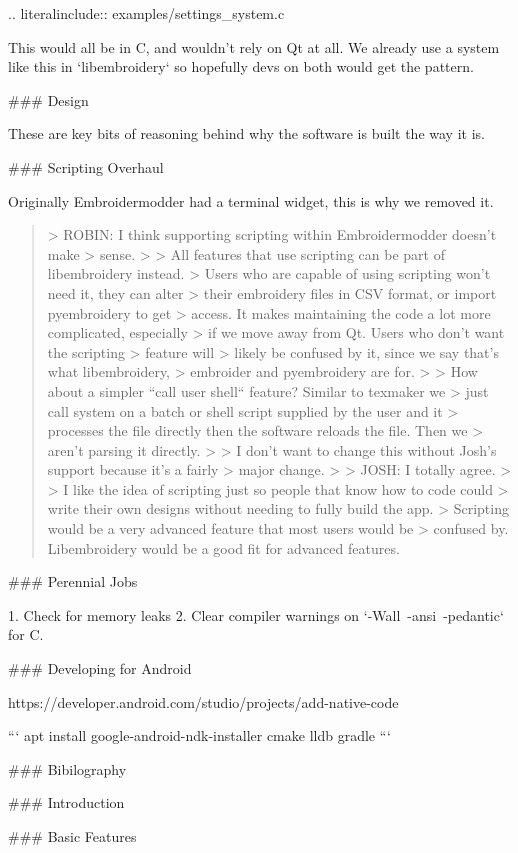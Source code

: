 .. literalinclude:: examples/settings\_system.c

This would all be in C, and wouldn't rely on Qt at all. We already use a
system like this in `libembroidery` so hopefully devs on both
would get the pattern.

### Design

These are key bits of reasoning behind why the software is built the way it is.

### Scripting Overhaul

Originally Embroidermodder had a terminal widget, this is why we removed it.

\begin{quote}
> ROBIN: I think supporting scripting within Embroidermodder doesn't make
> sense.
>
> All features that use scripting can be part of libembroidery instead.
> Users who are capable of using scripting won't need it, they can alter
> their embroidery files in CSV format, or import pyembroidery to get
> access. It makes maintaining the code a lot more complicated, especially
> if we move away from Qt. Users who don't want the scripting > feature will
> likely be confused by it, since we say that's what  libembroidery,
> embroider and pyembroidery are for.
>
> How about a simpler ``call user shell`` feature? Similar to texmaker we
> just call system on a batch or shell script supplied by the user and it
> processes the file directly then the software reloads the file. Then we
> aren't parsing it directly.
>
> I don't want to change this without Josh's support because it's a fairly
> major change.
>
> JOSH: I totally agree.
>
> I like the idea of scripting just so people that know how to code could
> write their own designs without needing to fully build the app.
> Scripting would be a very advanced feature that most users would be
> confused by. Libembroidery would be a good fit for advanced features.
\end{quote}

### Perennial Jobs

1. Check for memory leaks
2. Clear compiler warnings on `-Wall\ -ansi\ -pedantic` for C.

### Developing for Android

https://developer.android.com/studio/projects/add-native-code

```
apt install google-android-ndk-installer cmake lldb gradle
```

### Bibilography

### Introduction

### Basic Features

